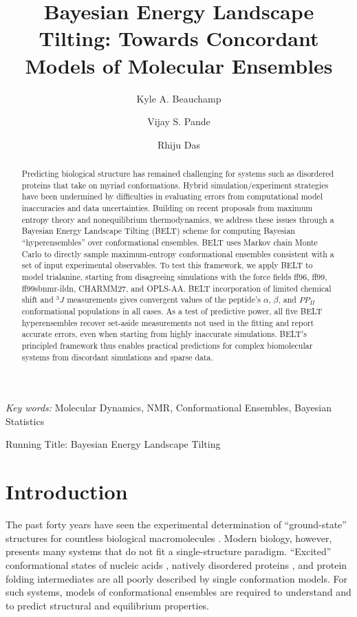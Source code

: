 \documentclass[12pt]{article}
\author{Kyle A. Beauchamp \and Vijay S. Pande \and Rhiju Das}
\title{Bayesian Energy Landscape Tilting: Towards Concordant Models of Molecular Ensembles}
\begin{document}
\maketitle

\begin{abstract}

Predicting biological structure has remained challenging for systems such as disordered proteins that take on myriad conformations. Hybrid simulation/experiment strategies have been undermined by difficulties in evaluating errors from computational model inaccuracies and data uncertainties. Building on recent proposals from maximum entropy theory and nonequilibrium thermodynamics, we address these issues through a Bayesian Energy Landscape Tilting (BELT) scheme for computing Bayesian \enquote{hyperensembles} over conformational ensembles.  BELT uses Markov chain Monte Carlo to directly sample maximum-entropy conformational ensembles consistent with a set of input experimental observables.  To test this framework, we apply BELT to model trialanine, starting from disagreeing simulations with the force fields ff96, ff99, ff99sbnmr-ildn, CHARMM27, and OPLS-AA. BELT incorporation of limited chemical shift and $^3J$ measurements gives convergent values of the peptide's $\alpha$, $\beta$, and $PP_{II}$ 
conformational populations in all cases. As a test of predictive power, all five BELT hyperensembles recover set-aside measurements not used in the fitting and report accurate errors, even when starting from highly inaccurate simulations. BELT's principled framework thus enables practical predictions for complex biomolecular systems from discordant simulations and sparse data.   

\end{abstract}

\emph{Key words:} Molecular Dynamics, NMR, Conformational Ensembles,  Bayesian Statistics

Running Title: Bayesian Energy Landscape Tilting

\clearpage

\section*{Introduction}

The past forty years have seen the experimental determination of ``ground-state'' structures for countless biological macromolecules \cite{Berman2000}. Modern biology, however, presents many systems that do not fit a single-structure paradigm.  ``Excited'' conformational states of nucleic acids \cite{dethoff2012}, natively disordered proteins \cite{fink2005}, and protein folding intermediates \cite{korzhnev2004} are all poorly described by single conformation models.  For such systems, models of conformational ensembles are required to understand and to predict structural and equilibrium properties.  
\end{document}
